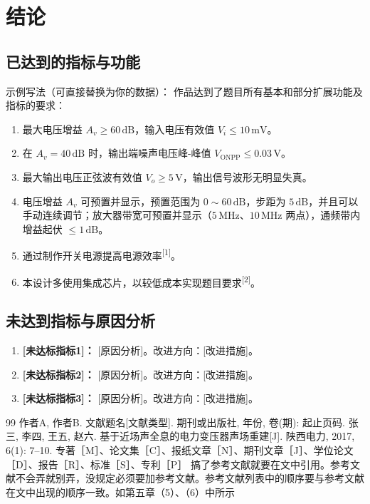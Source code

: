 \documentclass[UTF8,zihao=-4]{ctexart}
\begin{document}
\section{结论}
\subsection{已达到的指标与功能}
\noindent 示例写法（可直接替换为你的数据）：
\noindent 作品达到了题目所有基本和部分扩展功能及指标的要求：
\begin{enumerate}
    \item 最大电压增益 $A_v \geq 60\,\mathrm{dB}$，输入电压有效值 $V_i \leq 10\,\mathrm{mV}$。
    \item 在 $A_v = 40\,\mathrm{dB}$ 时，输出端噪声电压峰-峰值 $V_{\mathrm{ONPP}} \leq 0.03\,\mathrm{V}$。
    \item 最大输出电压正弦波有效值 $V_o \geq 5\,\mathrm{V}$，输出信号波形无明显失真。
    \item 电压增益 $A_v$ 可预置并显示，预置范围为 $0\sim 60\,\mathrm{dB}$，步距为 $5\,\mathrm{dB}$，并且可以手动连续调节；放大器带宽可预置并显示（$5\,\mathrm{MHz}$、$10\,\mathrm{MHz}$ 两点），通频带内增益起伏 $\leq 1\,\mathrm{dB}$。
    \item 通过制作开关电源提高电源效率\textsuperscript{[1]}。
    \item 本设计多使用集成芯片，以较低成本实现题目要求\textsuperscript{[2]}。
\end{enumerate}

\subsection{未达到指标与原因分析}
\begin{enumerate}
    \item \textbf{[未达标指标1]：} [原因分析]。改进方向：[改进措施]。
    \item \textbf{[未达标指标2]：} [原因分析]。改进方向：[改进措施]。
    \item \textbf{[未达标指标3]：} [原因分析]。改进方向：[改进措施]。
\end{enumerate}

\begin{thebibliography}{99}
 作者A, 作者B. 文献题名[文献类型]. 期刊或出版社, 年份, 卷(期): 起止页码.
 张三, 李四, 王五, 赵六. 基于近场声全息的电力变压器声场重建[J]. 陕西电力, 2017, 6(1): 7--10.
 专著［M］、论文集［C］、报纸文章［N］、期刊文章［J］、学位论文［D］、报告［R］、标准［S］、专利［P］
 搞了参考文献就要在文中引用。参考文献不会弄就别弄，没规定必须要加参考文献。参考文献列表中的顺序要与参考文献在文中出现的顺序一致。如第五章（5）、（6）中所示
\end{thebibliography}
\end{document}
